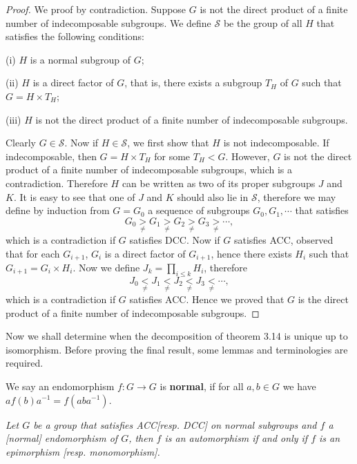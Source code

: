 \begin{proof}
We proof by contradiction. Suppose $G$ is not the direct product of a finite number of indecomposable subgroups. We define $\mathcal{S}$ be the group of all $H$ that satisfies the following conditions:\par
(i) $H$ is a normal subgroup of $G$;\par
(ii) $H$ is a direct factor of $G$, that is, there exists a subgroup $T_H$ of $G$ such that $G=H\times T_H$;\par
(iii) $H$ is not the direct product of a finite number of indecomposable subgroups.\par
Clearly $G\in\mathcal{S}$. Now if $H\in\mathcal{S}$, we first show that $H$ is not indecomposable. If indecomposable, then $G=H\times T_H$ for some $T_H<G$. However, $G$ is not the direct product of a finite number of indecomposable subgroups, which is a contradiction. Therefore $H$ can be written as two of its proper subgroups $J$ and $K$. It is easy to see that one of $J$ and $K$ should also lie in $\mathcal{S}$, therefore we may define by induction from $G=G_0$ a sequence of subgroups $G_0,G_1,\cdots$ that satisfies 
$$
G_0\underset{\ne}{>}G_1\underset{\ne}{>}G_2\underset{\ne}{>}G_3\underset{\ne}{>}\cdots ,
$$
which is a contradiction if $G$ satisfies DCC. Now if $G$ satisfies ACC, observed that for each $G_{i+1}$, $G_i$ is a direct factor of $G_{i+1}$, hence there exists $H_i$ such that $G_{i+1}=G_i\times H_i$. Now we define $J_k=\prod_{i\le k}{H_i}$, therefore 
$$
J_0\underset{\ne}{<}J_1\underset{\ne}{<}J_2\underset{\ne}{<}J_3\underset{\ne}{<}\cdots ,
$$
which is a contradiction if $G$ satisfies ACC. Hence we proved that $G$ is the direct product of a finite number of indecomposable subgroups.
\end{proof}
Now we shall determine when the decomposition of theorem 3.14 is unique up to isomorphism. Before proving the final result, some lemmas and terminologies are required.\par
We say an endomorphism $f:G\to G$ is \textbf{normal}, if for all $a,b\in G$ we have $af(b)a^{-1}=f(aba^{-1})$.\par
\begin{lemma}\em
Let $G$ be a group that satisfies ACC[resp. DCC] on normal subgroups and $f$ a [normal] endomorphism of $G$, then $f$ is an automorphism if and only if $f$ is an epimorphism [resp. monomorphism].
\end{lemma}
